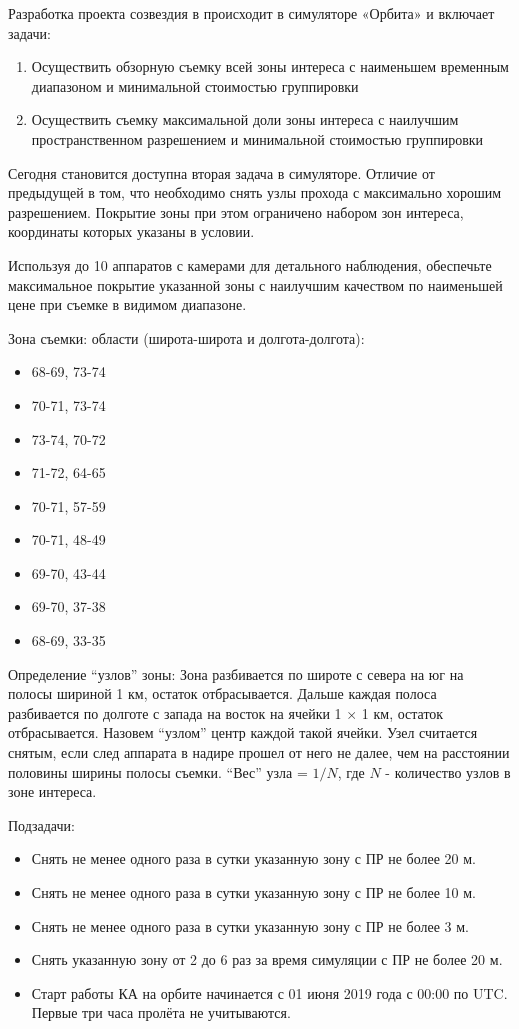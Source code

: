 Разработка проекта созвездия в происходит в симуляторе «Орбита» и включает задачи:

\begin{enumerate}
    \item Осуществить обзорную съемку всей зоны интереса с наименьшем временным диапазоном и минимальной стоимостью группировки
    \item Осуществить съемку максимальной доли зоны интереса с наилучшим пространственном разрешением и минимальной стоимостью группировки
\end{enumerate}

Сегодня становится доступна вторая задача в симуляторе. Отличие от предыдущей в том, что необходимо снять узлы прохода с максимально хорошим разрешением. Покрытие зоны при этом ограничено набором зон интереса, координаты которых указаны в условии.

Используя до 10 аппаратов с камерами для детального наблюдения, обеспечьте максимальное покрытие указанной зоны с наилучшим качеством по наименьшей цене при съемке в видимом диапазоне.

Зона съемки: области (широта-широта и долгота-долгота):

\begin{itemize}
    \item 68-69, 73-74
    \item 70-71, 73-74
    \item 73-74, 70-72
    \item 71-72, 64-65
    \item 70-71, 57-59
    \item 70-71, 48-49
    \item 69-70, 43-44
    \item 69-70, 37-38
    \item 68-69, 33-35
\end{itemize}

Определение “узлов” зоны: Зона разбивается по широте с севера на юг на полосы шириной 1 км, остаток отбрасывается. Дальше каждая полоса разбивается по долготе с запада на восток на ячейки 1 $\times$ 1 км, остаток отбрасывается. Назовем “узлом” центр каждой такой ячейки. Узел считается снятым, если след аппарата в надире прошел от него не далее, чем на расстоянии половины ширины полосы съемки. “Вес” узла = $1/N$, где $N$ - количество узлов в зоне интереса.

Подзадачи:

\begin{itemize}
    \item Снять не менее одного раза в сутки указанную зону с ПР не более 20 м.
    \item Снять не менее одного раза в сутки указанную зону с ПР не более 10 м.
    \item Снять не менее одного раза в сутки указанную зону с ПР не более 3 м.
    \item Снять указанную зону от 2 до 6 раз за время симуляции с ПР не более 20 м.
    \item Старт работы КА на орбите начинается с 01 июня 2019 года с 00:00 по UTC. Первые три часа пролёта не учитываются.
\end{itemize}

